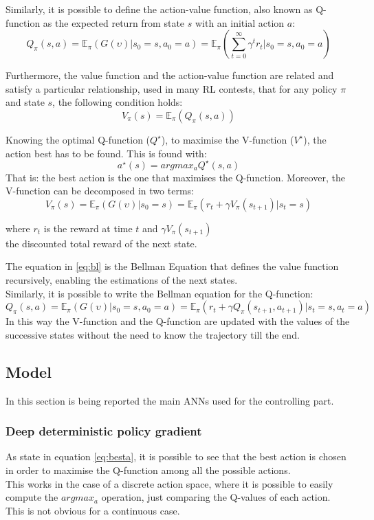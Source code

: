 \noindent Similarly, it is possible to define the action-value function, also known as Q-function as the expected return from state $s$ with an initial action $a$:
\[Q_{\pi}(s,a) = \mathbb{E}_{\pi}(G(\upsilon)|s_0=s, a_0=a) = \mathbb{E}_{\pi}(\sum_{t=0}^{\infty} \gamma^t r_t|s_0=s,a_0=a)\]

Furthermore, the value function and the action-value function are related and satisfy a particular relationship, used in many \gls{RL} contests, that for any policy $\pi$ and state $s$, the following condition holds:
\[V_{\pi}(s) = \mathbb{E}_{\pi}(Q_{\pi}(s,a))\]

Knowing the optimal Q-function ($Q^\star$), to maximise the V-function ($V^\star$), the action best has to be found. This is found with:
\begin{equation} \label{eq:besta}
    a^\star(s) = argmax_a Q^\star(s,a)
\end{equation} 
That is: the best action is the one that maximises the Q-function.
\pp
Moreover, the V-function can be decomposed in two terms:
\begin{equation} \label{eq:bl}
V_{\pi}(s) = \mathbb{E}_{\pi}(G(\upsilon)|s_0=s) =
					\mathbb{E}_{\pi}( r_t + \gamma V_{\pi}(s_{t+1})|s_t=s)
\end{equation}
\begin{center}
where $r_t$ is the reward at time $t$ and $\gamma V_{\pi}(s_{t+1})$ \\the discounted total reward of the next state.
\end{center}

\noindent The equation in \ref{eq:bl} is the Bellman Equation that defines the value function recursively, enabling the estimations of the next states. \\
Similarly, it is possible to write the Bellman equation for the Q-function:
\[Q_{\pi}(s,a) = \mathbb{E}_{\pi}(G(\upsilon)|s_0=s, a_0=a) = 
\mathbb{E}_{\pi}(r_t + \gamma Q_{\pi}(s_{t+1},a_{t+1})| s_t=s, a_t=a) \]
In this way the V-function and the  Q-function are updated with the values of the successive states without the need to know the trajectory till the end.


\subsection{Model}
\label{ssec:modelsRL}
In this section is being reported the main \glspl{ANN} used for the controlling part. 

\subsubsection{Deep deterministic policy gradient}
\label{sssec:ddpg}
As state in equation \ref{eq:besta}, it is possible to see that the best action is chosen in order to maximise the Q-function among all the possible actions.\\
This works in the case of a discrete action space, where it is possible to easily compute the $argmax_a$ operation, just comparing the Q-values of each action. This is not obvious for a continuous case.\\


